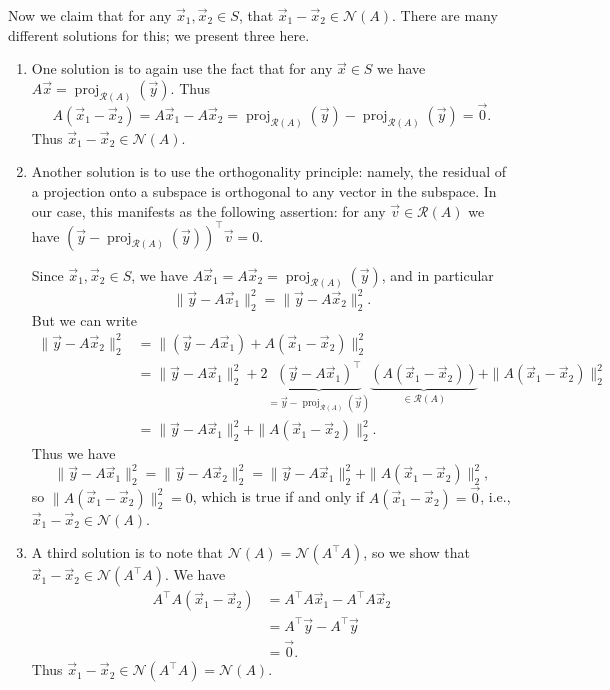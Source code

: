 \documentclass[10pt]{article}
\theoremstyle{definition}
\theoremstyle{plain}
\newcommand{\NN}{\mathcal{N}}
\newcommand{\Range}{\mathcal{R}}
\DeclareMathOperator{\proj}{proj}
\begin{document}
\begin{enumerate}[label=(\alph*), start=3]
Now we claim that for any $\vec{x}_1, \vec{x}_2 \in S$, that $\vec{x}_1 - \vec{x}_2 \in \NN(A)$. There are many different solutions for this; we present three here.
\begin{enumerate}[label=\roman*.]
\item One solution is to again use the fact that for any $\vec{x} \in S$ we have $A\vec{x} = \proj_{\Range(A)}(\vec{y})$. Thus
\begin{equation}
A(\vec{x}_1 - \vec{x}_2) = A\vec{x}_1 - A\vec{x}_2 = \proj_{\Range(A)}(\vec{y}) - \proj_{\Range(A)}(\vec{y}) = \vec{0}.
\end{equation}
Thus $\vec{x}_1 - \vec{x}_2 \in \NN(A)$.

\item Another solution is to use the orthogonality principle: namely, the residual of a projection onto a subspace is orthogonal to any vector in the subspace. In our case, this manifests as the following assertion: for any $\vec{v} \in \Range(A)$ we have $(\vec{y} - \proj_{\Range(A)}(\vec{y}))^\top \vec{v} = 0$.

Since $\vec{x}_1, \vec{x}_2 \in S$, we have $A\vec{x}_1 = A\vec{x}_2 = \proj_{\Range(A)}(\vec{y})$, and in particular
\begin{equation}
\|\vec{y} - A\vec{x}_1\|_2^2 = \|\vec{y} - A\vec{x}_2\|_2^2.
\end{equation}
But we can write
\begin{align}
\|\vec{y} - A\vec{x}_2\|_2^2 &= \|(\vec{y} - A\vec{x}_1) + A(\vec{x}_1 - \vec{x}_2)\|_2^2 \\
&= \|\vec{y} - A\vec{x}_1\|_2^2 + 2\underbrace{(\vec{y} - A\vec{x}_1)^\top}_{\textstyle = \vec{y} - \proj_{\Range(A)}(\vec{y})} \underbrace{(A(\vec{x}_1 - \vec{x}_2))}_{\textstyle \in \Range(A)} + \|A(\vec{x}_1 - \vec{x}_2)\|_2^2 \\
&= \|\vec{y} - A\vec{x}_1\|_2^2 + \|A(\vec{x}_1 - \vec{x}_2)\|_2^2.
\end{align}
Thus we have
\begin{equation}
\|\vec{y} - A\vec{x}_1\|_2^2 = \|\vec{y} - A\vec{x}_2\|_2^2 = \|\vec{y} - A\vec{x}_1\|_2^2 + \|A(\vec{x}_1 - \vec{x}_2)\|_2^2,
\end{equation}
so $\|A(\vec{x}_1 - \vec{x}_2)\|_2^2 = 0$, which is true if and only if $A(\vec{x}_1 - \vec{x}_2) = \vec{0}$, i.e., $\vec{x}_1 - \vec{x}_2 \in \NN(A)$.

\item A third solution is to note that $\NN(A) = \NN\!\left(A^\top A\right)$, so we show that $\vec{x}_1 - \vec{x}_2 \in \NN\!\left(A^\top A\right)$. We have
\begin{align}
A^\top A(\vec{x}_1 - \vec{x}_2) &= A^\top A \vec{x}_1 - A^\top A \vec{x}_2 \\
&= A^\top \vec{y} - A^\top \vec{y} \\
&= \vec{0}.
\end{align}
Thus $\vec{x}_1 - \vec{x}_2 \in \NN\!\left(A^\top A\right) = \NN(A)$.
\end{enumerate}


\end{enumerate}
\end{document}
